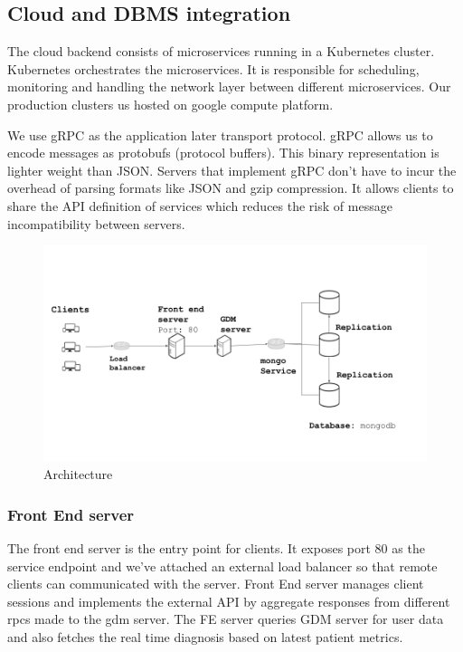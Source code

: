 \documentclass[conference,compsoc]{IEEEtran}
\begin{document}
\subsection{Cloud and DBMS integration}

The cloud backend consists of microservices running in  a Kubernetes cluster. Kubernetes orchestrates the microservices. It is responsible for scheduling, monitoring and handling the network layer between different microservices. Our production clusters us hosted on google compute platform.

We use gRPC as the application later transport protocol. gRPC allows us to encode messages as protobufs (protocol buffers). This binary representation is lighter weight than JSON. Servers that implement gRPC don't have to incur the overhead of parsing formats like JSON and gzip compression. It allows clients to share the API definition of services which reduces the risk of message incompatibility between servers.


\begin{figure}
    \centering
    \includegraphics[width=1.0\linewidth]{project_slide.png}
    \caption{Architecture}
    \label{fig:enter-label}
\end{figure}

\subsubsection{Front End server}
The front end server is the entry point for clients. It exposes port 80 as the service endpoint and we've attached an external load balancer so that remote clients can communicated with the server. Front End server manages client sessions and implements the external API by aggregate responses from different rpcs made to the gdm server. The FE server queries GDM server for user data and also fetches the real time diagnosis based on latest patient metrics.
\end{document}
